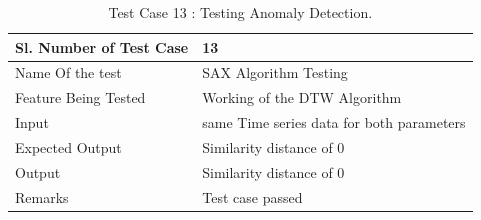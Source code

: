 \documentclass[12pt,a4paper]{report}
\begin{document}
\begin{table}
    \begin{tabular}{|l|l|}
    \hline
    Sl. Number of Test Case & 13                           \\ \hline
    Name Of the test        & SAX Algorithm Testing        \\ \hline
    Feature Being Tested    & Working of the DTW Algorithm \\ \hline
    Input                   & same Time series data for both parameters\\ \hline
    Expected Output         & Similarity distance of 0 \\ \hline
    Output                  & Similarity distance of 0 \\ \hline
    Remarks                 & Test case passed              \\ \hline
    \end{tabular}
    \caption {Test Case 13 : Testing Anomaly Detection.}
\end{table}
\end{document}
